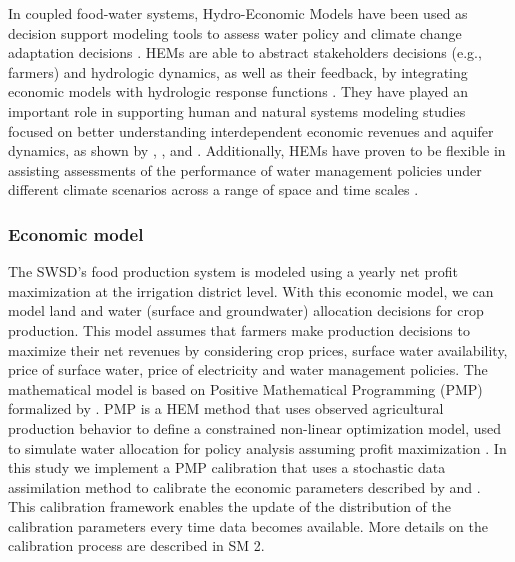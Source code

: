 \documentclass[a4paper,fleqn]{cas-sc}
\begin{document}
In coupled food-water systems, Hydro-Economic Models have been used as decision support modeling tools to assess water policy and climate change adaptation decisions \citep{ward_hydroeconomic_2021,harou_hydro-economic_2009}. HEMs are able to abstract stakeholders decisions (e.g., farmers) and hydrologic dynamics, as well as their feedback, by integrating economic models with hydrologic response functions \citep{harou_hydro-economic_2009}. They have played an important role in supporting human and natural systems modeling studies focused on better understanding interdependent economic revenues and aquifer dynamics, as shown by \citet{macewan_hydroeconomic_2017}, \citet{afshar_multi-objective_2020}, \citet{graveline_combining_2020} and \citet{rodriguez-flores_global_2022}. Additionally, HEMs have proven to be flexible in assisting assessments of the performance of water management policies under different climate scenarios across a range of space and time scales \citep{partida_hydro-economic_2023}.

\subsubsection{Economic model}\label{sct:hem}

The SWSD's food production system is modeled using a yearly net profit maximization at the irrigation district level. With this economic model, we can model land and water (surface and groundwater) allocation decisions for crop production. This model assumes that farmers make production decisions to maximize their net revenues by considering crop prices, surface water availability, price of surface water, price of electricity and water management policies. The mathematical model is based on Positive Mathematical Programming (PMP) formalized by \citet{howitt_calibration_1995}. PMP is a HEM method that uses observed agricultural production behavior to define a constrained non-linear optimization model, used to simulate water allocation for policy analysis assuming profit maximization \citep{graveline_combining_2020,macewan_hydroeconomic_2017,howitt_calibrating_2012,rodriguez-flores_insights_2019}. In this study we implement a PMP calibration that uses a stochastic data assimilation method to calibrate the economic parameters described by \citet{maneta_stochastic_2014} and \citet{maneta_satellite-driven_2020}. This calibration framework enables the update of the distribution of the calibration parameters every time data becomes available. More details on the calibration process are described in SM 2. 
\end{document}

